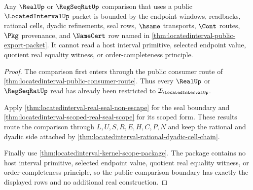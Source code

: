 \begin{theorem}
\label{thm:locatedinterval-real-comparison-boundary}
Any $\RealUp$ or $\RegSeqRatUp$ comparison that uses a public $\LocatedIntervalUp$ packet is bounded by the endpoint windows, readbacks, rational cells, dyadic refinements, seal rows, $\hsame$ transports, $\Cont$ routes, $\Pkg$ provenance, and $\NameCert$ row named in \autoref{thm:locatedinterval-public-export-packet}. It cannot read a host interval primitive, selected endpoint value, quotient real equality witness, or order-completeness principle.
\end{theorem}
\begin{proof}
The comparison first enters through the public consumer route of \autoref{thm:locatedinterval-public-consumer-route}. Thus every $\RealUp$ or $\RegSeqRatUp$ read has already been restricted to $\mathcal{I}_{\LocatedIntervalUp}$.

Apply \autoref{thm:locatedinterval-real-seal-non-escape} for the seal boundary and \autoref{thm:locatedinterval-scoped-real-seal-scope} for its scoped form. These results route the comparison through $L,U,S,R,E,H,C,P,N$ and keep the rational and dyadic side attached by \autoref{thm:locatedinterval-rational-dyadic-cell-chain}.

Finally use \autoref{thm:locatedinterval-kernel-scope-package}. The package contains no host interval primitive, selected endpoint value, quotient real equality witness, or order-completeness principle, so the public comparison boundary has exactly the displayed rows and no additional real construction.
\end{proof}

